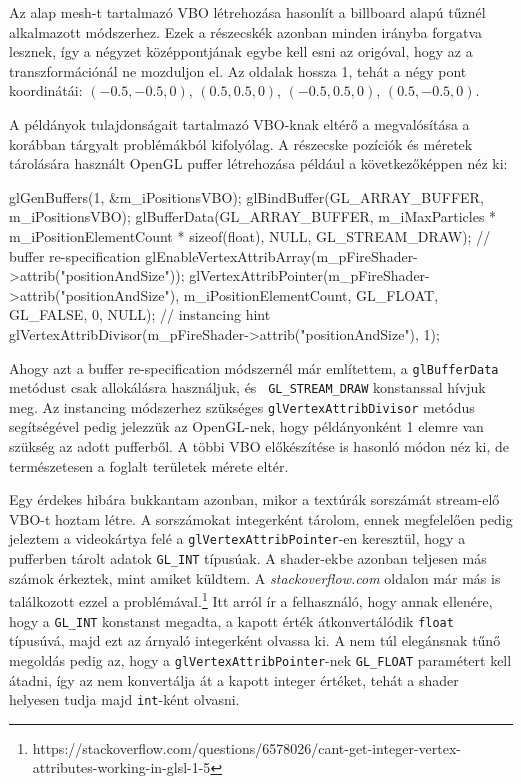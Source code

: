 Az alap mesh-t tartalmazó VBO létrehozása hasonlít a billboard alapú tűznél alkalmazott módszerhez. Ezek a részecskék azonban minden irányba forgatva lesznek, így a négyzet középpontjának egybe kell esni az origóval, hogy az a transzformációnál ne mozduljon el. Az oldalak hossza 1, tehát a négy pont koordinátái: $(-0.5, -0.5, 0)$, $(0.5, 0.5, 0)$, $(-0.5, 0.5, 0)$, $(0.5, -0.5, 0)$.

A példányok tulajdonságait tartalmazó VBO-knak eltérő a megvalósítása a korábban tárgyalt problémákból kifolyólag. A részecske pozíciók és méretek tárolására használt OpenGL puffer létrehozása például a következőképpen néz ki:
\begin{cpp}
glGenBuffers(1, &m_iPositionsVBO);
glBindBuffer(GL_ARRAY_BUFFER, m_iPositionsVBO);
glBufferData(GL_ARRAY_BUFFER, 
	m_iMaxParticles * m_iPositionElementCount * sizeof(float), 
	NULL, GL_STREAM_DRAW); // buffer re-specification
glEnableVertexAttribArray(m_pFireShader->attrib("positionAndSize"));
glVertexAttribPointer(m_pFireShader->attrib("positionAndSize"), 
	m_iPositionElementCount, GL_FLOAT, GL_FALSE, 0, NULL);
// instancing hint
glVertexAttribDivisor(m_pFireShader->attrib("positionAndSize"), 1);
\end{cpp}
Ahogy azt a buffer re-specification módszernél már említettem, a \texttt{glBufferData} metódust csak allokálásra használjuk, és \texttt{ GL\_STREAM\_DRAW} konstanssal hívjuk meg. Az instancing módszerhez szükséges \texttt{glVertexAttribDivisor} metódus segítségével pedig jelezzük az OpenGL-nek, hogy példányonként 1 elemre van szükség az adott pufferből. A többi VBO előkészítése is hasonló módon néz ki, de természetesen a foglalt területek mérete eltér.

Egy érdekes hibára bukkantam azonban, mikor a textúrák sorszámát stream-elő VBO-t hoztam létre. A sorszámokat integerként tárolom, ennek megfelelően pedig jeleztem a videokártya felé a \texttt{glVertexAttribPointer}-en keresztül, hogy a pufferben tárolt adatok \texttt{GL\_INT} típusúak. A shader-ekbe azonban teljesen más számok érkeztek, mint amiket küldtem. A \textit{stackoverflow.com} oldalon már más is találkozott ezzel a problémával.\footnote{https://stackoverflow.com/questions/6578026/cant-get-integer-vertex-attributes-working-in-glsl-1-5} Itt arról ír a felhasználó, hogy annak ellenére, hogy a \texttt{GL\_INT} konstanst megadta, a kapott érték átkonvertálódik \texttt{float} típusúvá, majd ezt az árnyaló integerként olvassa ki. A nem túl elegánsnak tűnő megoldás pedig az, hogy a \texttt{glVertexAttribPointer}-nek  \texttt{GL\_FLOAT} paramétert kell átadni, így az nem konvertálja át a kapott integer értéket, tehát a shader helyesen tudja majd \texttt{int}-ként olvasni.

